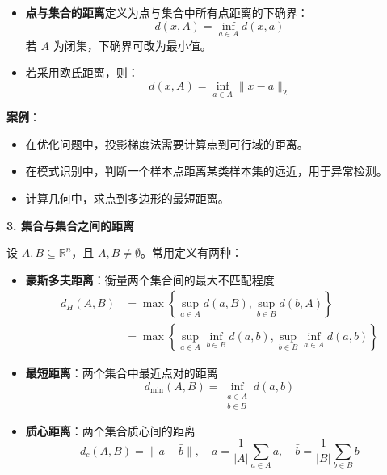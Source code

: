 \documentclass[UTF8]{article}
\begin{document}
\begin{itemize}[leftmargin=1.5em]
    \item \textbf{点与集合的距离}定义为点与集合中所有点距离的下确界：
    \begin{equation}
        d(x, A) = \inf_{a \in A} d(x, a)
    \end{equation}
    若 $A$ 为闭集，下确界可改为最小值。
    
    \item 若采用欧氏距离，则：
    \begin{equation}
        d(x, A) = \inf_{a \in A} \|x - a\|_2
    \end{equation}
\end{itemize}

\textbf{案例}：
\begin{itemize}[leftmargin=1.5em]
    \item 在优化问题中，投影梯度法需要计算点到可行域的距离。
    \item 在模式识别中，判断一个样本点距离某类样本集的远近，用于异常检测。
    \item 计算几何中，求点到多边形的最短距离。
\end{itemize}

\vspace{1em}
\textbf{3. 集合与集合之间的距离}
\vspace{0.5em}

设 $A, B \subseteq \mathbb{R}^n$，且 $A, B \neq \emptyset$。常用定义有两种：

\begin{itemize}[leftmargin=1.5em]
    \item \textbf{豪斯多夫距离}：衡量两个集合间的最大不匹配程度
    \begin{align}
        d_H(A, B) &= \max \left\{ \sup_{a \in A} d(a, B), \sup_{b \in B} d(b, A) \right\} \\
        &= \max \left\{ \sup_{a \in A} \inf_{b \in B} d(a, b), \sup_{b \in B} \inf_{a \in A} d(a, b) \right\}
    \end{align}
    
    \item \textbf{最短距离}：两个集合中最近点对的距离
    \begin{equation}
        d_{\min}(A, B) = \inf_{\substack{a \in A \\ b \in B}} d(a, b)
    \end{equation}
    
    \item \textbf{质心距离}：两个集合质心间的距离
    \begin{equation}
        d_c(A, B) = \|\bar{a} - \bar{b}\|, \quad \bar{a} = \frac{1}{|A|} \sum_{a \in A} a, \quad \bar{b} = \frac{1}{|B|} \sum_{b \in B} b
    \end{equation}
\end{itemize}
\end{document}
